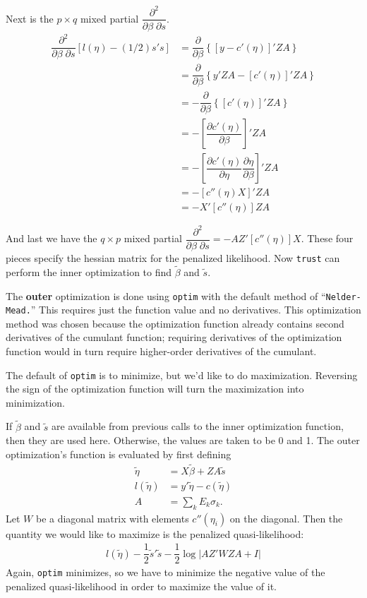 \documentclass{article}
\begin{document}
Next is the $p \times q$ mixed partial $\dfrac{\partial^2}{  \partial \beta \; \partial s}$.
\begin{align}
\dfrac{\partial^2}{ \partial \beta \;  \partial s}  \left[ l(\eta) - (1/2) s's   \right] &= \dfrac{\partial}{\partial \beta} \left\{  \left[ y-c'(\eta)  \right]' ZA  \right\}\\
&= \dfrac{\partial}{\partial \beta} \left\{y'ZA-  \left[ c'(\eta)  \right]' ZA  \right\} \\
&=- \dfrac{\partial}{\partial \beta} \left\{  \left[ c'(\eta)  \right]' ZA  \right\} \\
&=- \left[  \dfrac{\partial  c'(\eta)}{\partial \beta}  \right]' ZA  \\
&=-   \left[  \dfrac{\partial  c'(\eta)}{\partial \eta} \dfrac{\partial \eta}{\partial \beta}  \right]' ZA   \\
&=-   \left[ c''(\eta) X  \right]' ZA   \\
&=-X'   \left[ c''(\eta)   \right] ZA  
\end{align}


And last we have the $q \times p$ mixed partial $\dfrac{\partial^2}{  \partial \beta \; \partial s}= -AZ' [c''(\eta)] X.$  These four pieces specify the hessian matrix for the penalized likelihood. Now \texttt{trust} can perform the inner optimization to find $\tilde{\beta}$ and $\tilde{s}$. 





The {\bf outer} optimization is done using \texttt{optim} with the default method of ``\texttt{Nelder-Mead.}'' This requires just the function value and no derivatives.  This optimization method was chosen because the optimization function already contains second derivatives of the cumulant function; requiring derivatives of the optimization function would in turn require higher-order derivatives of the cumulant.  

The default of \texttt{optim} is to minimize, but we'd like to  do maximization. Reversing the sign of the optimization function will turn the maximization into minimization.

If $\tilde{\beta}$ and $\tilde{s}$ are available from previous calls to the inner optimization function, then they are used here. Otherwise, the values are taken to be 0 and 1. The outer optimization's function is evaluated by first defining
\begin{align}
\tilde{\eta} &= X \tilde{\beta} +ZA \tilde{s}\\
l(\tilde{\eta}) &= y' \tilde{\eta} - c(\tilde{\eta})\\
A&= \sum_k E_k \sigma_k.
\end{align}
Let $W$ be a diagonal matrix with elements $c''(\eta_i)$ on the diagonal. Then the quantity we would like to maximize is the penalized quasi-likelihood:
\begin{align}
 l(\tilde{\eta}) - \dfrac{1}{2} \tilde{s}' \tilde{s} - \dfrac{1}{2} \log  \left| AZ' W ZA +I  \right| 
\end{align}
Again, \texttt{optim} minimizes, so we have to minimize the negative value of the penalized quasi-likelihood in order to maximize the value of it.
\end{document}
